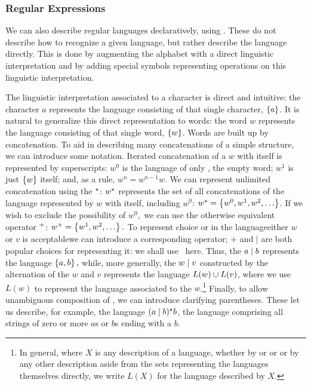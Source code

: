 \subsubsection{Regular Expressions}
We can also describe regular languages declaratively, using . These do not describe how to recognize a given language, but rather describe the language directly. This is done by augmenting the alphabet with a direct linguistic interpretation and by adding special symbols representing operations on this linguistic interpretation. 

The linguistic interpretation associated to a character is direct and intuitive: the character $a$ represents the language consisting of that single character, $\left\{ a \right\}$. It is natural to generalize this direct representation to words: the word $w$ represents the language consisting of that single word, $\left\{ w \right\}$. Words are built up by concatenation. To aid in describing many concatenations of a simple structure, we can introduce some notation. Iterated concatenation of a \regex $w$ with itself is represented by superscripts: $w^{0}$ is the language of only \emptyword, the empty word; $w^{1}$ is just $\left\{ w \right\}$ itself; and, as a rule, $w^{n} = w^{n-1}w$. We can represent unlimited concatenation using the  $^{\star}{}$: $w^{\star}{}$ represents the set of all concatenations of the language represented by $w$ with itself, including $w^{0}$: $w\kstar = \set{w^{0}, w^{1}, w^{2}, \dotsc}$. If we wish to exclude the possibility of $w^{0},$ we can use the otherwise equivalent  operator $^{+}{}$: $w\posclos = \set{w^{1}, w^{2}, \dotsc}.$ To represent choice or  in the language\empause either \regex $w$ or \regex $v$ is acceptable\empause we can introduce a corresponding operator; $+$ and $\vert$ are both popular choices for representing it: we shall use \alt\ here. Thus, the \regex $a \mid b$ represents the language $\left\{ a, b \right\},$ while, more generally, the \regex $w \mid v$ constructed by the alternation of the \regexes $w$ and $v$ represents the language $L(w) \cup L(v)$, where we use $L(w)$ to represent the language associated to the \regex $w$.\footnote{In general, where $X$ is any description of a language, whether by \TM or \FA or \regex or by any other description aside from the sets representing the languages themselves directly, we write $L(X)$ for the language described by $X$.} Finally, to allow unambiguous composition of \regexes, we can introduce clarifying parentheses. These let us describe, for example, the language $(a \mid b)^{\star}{} b$, the language comprising all strings of zero or more $a$s or $b$s ending with a $b$.

